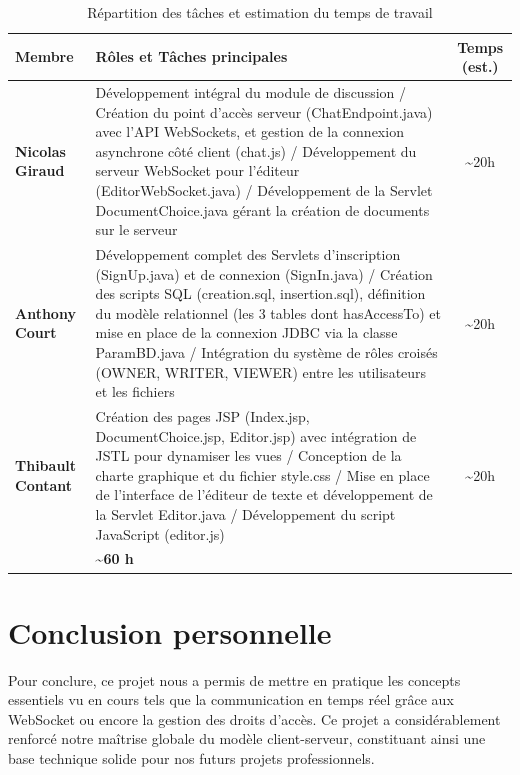 \documentclass[14pt,a4paper]{extarticle}
\begin{document}
\begin{table}[H]
\centering
\begin{tabularx}{\textwidth}{>{\hsize=0.6\hsize}X >{\hsize=1.4\hsize}X >{\hsize=0.15\hsize}c}
\toprule
\textbf{Membre} & \textbf{Rôles et Tâches principales} & \textbf{Temps (est.)} \\ \midrule
\textbf{Nicolas Giraud} & Développement intégral du module de discussion / Création du point d'accès serveur (ChatEndpoint.java) avec l'API WebSockets, et gestion de la connexion asynchrone côté client (chat.js) / Développement du serveur WebSocket pour l'éditeur (EditorWebSocket.java) / Développement de la Servlet DocumentChoice.java gérant la création de documents sur le serveur &\textasciitilde 20h \\ \addlinespace
\textbf{Anthony Court} & Développement complet des Servlets d'inscription (SignUp.java) et de connexion (SignIn.java) / Création des scripts SQL (creation.sql, insertion.sql), définition du modèle relationnel (les 3 tables dont hasAccessTo) et mise en place de la connexion JDBC via la classe ParamBD.java / Intégration du système de rôles croisés (OWNER, WRITER, VIEWER) entre les utilisateurs et les fichiers& \textasciitilde 20h \\ \addlinespace
\textbf{Thibault Contant} & Création des pages JSP (Index.jsp, DocumentChoice.jsp, Editor.jsp) avec intégration de JSTL pour dynamiser les vues / Conception de la charte graphique et du fichier style.css / Mise en place de l'interface de l'éditeur de texte et développement de la Servlet Editor.java / Développement du script JavaScript (editor.js)& \textasciitilde 20h \\ 
\midrule
\multicolumn{2}{r}{\textbf{Temps global consacré au projet}} & \textbf{\textasciitilde 60 h} \\ \bottomrule
\end{tabularx}
\caption{Répartition des tâches et estimation du temps de travail}
\end{table}

\section{Conclusion personnelle}
Pour conclure, ce projet nous a permis de mettre en pratique les concepts essentiels vu en cours tels que la communication en temps réel grâce aux WebSocket ou encore la gestion des droits d'accès.
Ce projet a considérablement renforcé notre maîtrise globale du modèle client-serveur, constituant ainsi une base technique solide pour nos futurs projets professionnels.
\end{document}
